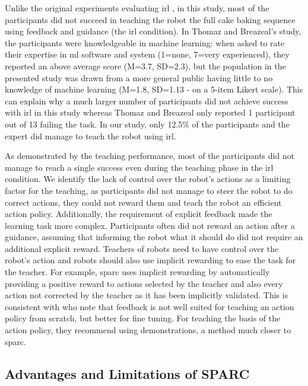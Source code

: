 
Unlike the original experiments evaluating \gls{irl} \citep{thomaz2008teachable}, in this study, most of the participants did not succeed in teaching the robot the full cake baking sequence using feedback and guidance (the \gls{irl} condition). In Thomaz and Breazeal's study, the participants were knowledgeable in machine learning: when asked to rate their expertise in \gls{ml} software and system (1=none, 7=very experienced), they reported an above average score (M=3.7, SD=2.3), but the population in the presented study was drawn from a more general public having little to no knowledge of machine learning (M=1.8, SD=1.13 - on a 5-item Likert scale). This can explain why a much larger number of participants did not achieve success with \gls{irl} in this study whereas Thomaz and Breazeal only reported 1 participant out of 13 failing the task. In our study, only 12.5\% of the participants and the expert did manage to teach the robot using \gls{irl}. 

As demonstrated by the teaching performance, most of the participants did not manage to reach a single success even during the teaching phase in the \gls{irl} condition. We identify the lack of control over the robot's actions as a limiting factor for the teaching, as participants did not manage to steer the robot to do correct actions, they could not reward them and teach the robot an efficient action policy. Additionally, the requirement of explicit feedback made the learning task more complex. Participants often did not reward an action after a guidance, assuming that informing the robot what it should do did not require an additional explicit reward. Teachers of robots need to have control over the robot's action and robots should also use implicit rewarding to ease the task for the teacher. For example, \gls{sparc} uses implicit rewarding by automatically providing a positive reward to actions selected by the teacher and also every action not corrected by the teacher as it has been implicitly validated. This is consistent with \cite{kaochar2011towards} who note that feedback is not well suited for teaching an action policy from scratch, but better for fine tuning. For teaching the basis of the action policy, they recommend using demonstrations, a method much closer to \gls{sparc}. 

\subsection{Advantages and Limitations of SPARC}


